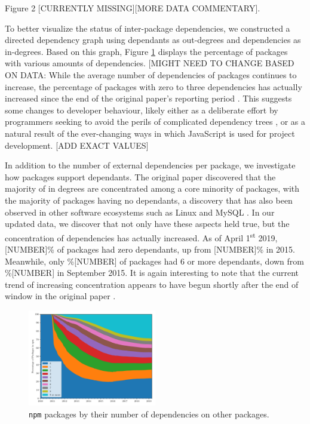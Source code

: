 \documentclass[10pt,conference]{IEEEtran}
\def\code#1{\texttt{#1}}
\begin{document}
Figure 2 [CURRENTLY MISSING][MORE DATA COMMENTARY].

To better visualize the status of inter-package dependencies, we constructed
a directed dependency graph using dependants as out-degrees and
dependencies as in-degrees. Based on this graph, Figure \ref{outDegree}
displays the percentage of packages with various amounts of dependencies. 
[MIGHT NEED TO CHANGE BASED ON DATA: While the average number of dependencies 
of packages continues to increase, the percentage of packages with zero 
to three dependencies has actually increased since the end of the original paper's
reporting period \cite{Wittern:2016}. This suggests some changes to developer 
behaviour, likely either as a deliberate effort by programmers seeking to avoid the perils of 
complicated dependency trees \cite{Kikas:2017}, or as a natural result of the ever-changing
ways in which JavaScript is used for project development. [ADD EXACT VALUES]

In addition to the number of external dependencies per package, 
we investigate how packages support dependants. The original paper 
discovered that the majority of in degrees are concentrated among a core 
minority of packages, with the majority of packages having no dependants,
a discovery that has also been observed in other software ecosystems such
as Linux and MySQL \cite{Myers:2003}. In our updated data, we discover 
that not only have these aspects held true, but the concentration of 
dependencies has actually increased. As of April 1\textsuperscript{st} 2019, [NUMBER]\% of packages
had zero dependants, up from [NUMBER]\% in 2015. Meanwhile, only \%[NUMBER] of packages
had 6 or more dependants, down from \%[NUMBER] in September 2015. It is again interesting to note
that the current trend of increasing concentration appears to have begun shortly after the end of window in the original
paper \cite{Wittern:2016}.

\begin{figure}
  \includegraphics[width=0.5\textwidth]{figures/npm_deps_monthly_out_degree.pdf}
  \caption{\code{npm} packages by their number of dependencies on other packages.}
  \label{outDegree}
\end{figure}
\end{document}
